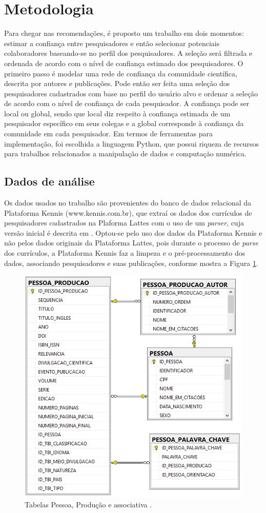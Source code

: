 \documentclass[12pt]{article}
\begin{document}
\section{Metodologia}

Para chegar nas recomendações, é proposto um trabalho em dois momentos: estimar a confiança entre pesquisadores e então
selecionar potenciais colaboradores baseando-se no perfil dos pesquisadores. A seleção será filtrada e ordenada de acordo com o 
nível de confiança estimado dos pesquisadores. O primeiro passo é modelar uma rede de confiança da comunidade científica, descrita 
por autores e publicações. Pode então ser feita uma seleção dos pesquisadores cadastrados com base no perfil do usuário alvo e 
ordenar a seleção de acordo com o nível de confiança de cada pesquisador. A confiança pode ser local ou global, sendo que local diz 
respeito à confiança estimada de um pesquisador específico em seus colegas e a global corresponde à confiança da comunidade em 
cada pesquisador. Em termos de ferramentas para implementação, foi escolhida a linguagem Python, que possui riqueza de 
recursos para trabalhos relacionados a manipulação de dados e computação numérica.%

\subsection{Dados de análise}

Os dados usados no trabalho são provenientes do banco de dados relacional da Plataforma Kennis (www.kennis.com.br), que extraí os 
dados dos currículos de pesquisadores cadastrados na Plaforma Lattes com o uso de um \textit{parser}, cuja versão inicial é descrita em \cite{prass2019parser}. Optou-se pelo uso dos dados da Plataforma Kennis e não pelos dados originais da Plataforma 
Lattes, pois durante o processo de \textit{parse} dos currículos, a Plataforma Kennis faz a limpeza e o pré-processamento dos 
dados, associando pesquisadores e suas publicações, conforme mostra a Figura \ref{fig:database}.

\begin{figure}[ht]
    \centering
    \includegraphics[width=.55\textwidth]{database.png}
    \caption{Tabelas Pessoa, Produção e associativa \cite{prass2019parser}.}\label{fig:database}
\end{figure}
 
\end{document}

